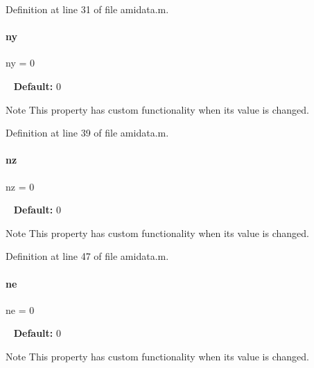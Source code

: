 Definition at line 31 of file amidata.\+m.

\mbox{\label{classamidata_a289ca425eb368f1d582b6be2be0d3dfc}} 
\paragraph{\texorpdfstring{ny}{ny}}
{\footnotesize\ttfamily ny = 0}

~\newline
{\bfseries{Default\+:}} 0

\begin{DoxyNote}{Note}
This property has custom functionality when its value is changed. 
\end{DoxyNote}


Definition at line 39 of file amidata.\+m.

\mbox{\label{classamidata_a79f11413e5bfe18a0e71e17574399ad5}} 
\paragraph{\texorpdfstring{nz}{nz}}
{\footnotesize\ttfamily nz = 0}

~\newline
{\bfseries{Default\+:}} 0

\begin{DoxyNote}{Note}
This property has custom functionality when its value is changed. 
\end{DoxyNote}


Definition at line 47 of file amidata.\+m.

\mbox{\label{classamidata_aaca25d624cf863f786f67137c62aa11d}} 
\paragraph{\texorpdfstring{ne}{ne}}
{\footnotesize\ttfamily ne = 0}

~\newline
{\bfseries{Default\+:}} 0

\begin{DoxyNote}{Note}
This property has custom functionality when its value is changed. 
\end{DoxyNote}


